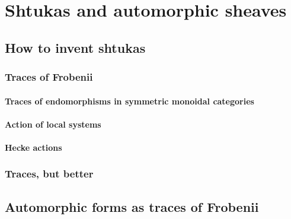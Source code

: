 \chapter{Shtukas and automorphic sheaves}
    \begin{abstract}
        
    \end{abstract}
    
    \section{How to invent shtukas}
        \subsection{Traces of Frobenii}
            \subsubsection{Traces of endomorphisms in symmetric monoidal categories}
            
            \subsubsection{Action of local systems}
            
            \subsubsection{Hecke actions}
            
        \subsection{Traces, but better}
        
    \section{Automorphic forms as traces of Frobenii}